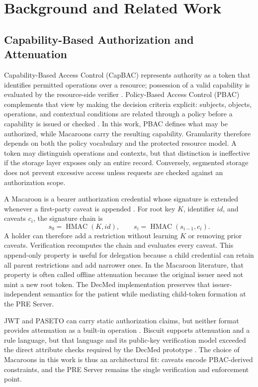 \section{Background and Related Work}
\label{sec:background}

\subsection{Capability-Based Authorization and Attenuation}

Capability-Based Access Control (CapBAC) represents authority as a token that identifies permitted operations over a resource; possession of a valid capability is evaluated by the resource-side verifier \cite{li2022capability}. Policy-Based Access Control (PBAC) complements that view by making the decision criteria explicit: subjects, objects, operations, and contextual conditions are related through a policy before a capability is issued or checked \cite{ferraiolo2015policy}. In this work, PBAC defines what may be authorized, while Macaroons carry the resulting capability. Granularity therefore depends on both the policy vocabulary and the protected resource model. A token may distinguish operations and contexts, but that distinction is ineffective if the storage layer exposes only an entire record. Conversely, segmented storage does not prevent excessive access unless requests are checked against an authorization scope.

A Macaroon is a bearer authorization credential whose signature is extended whenever a first-party caveat is appended \cite{birgisson2014macaroons}. For root key $K$, identifier $id$, and caveats $c_i$, the signature chain is
\begin{equation}
	s_0=\operatorname{HMAC}(K,id),\qquad
	s_i=\operatorname{HMAC}(s_{i-1},c_i).
	\label{eq:macaroon-chain}
\end{equation}
A holder can therefore add a restriction without learning $K$ or removing prior caveats. Verification recomputes the chain and evaluates every caveat. This append-only property is useful for delegation because a child credential can retain all parent restrictions and add narrower ones. In the Macaroon literature, that property is often called offline attenuation because the original issuer need not mint a new root token. The DecMed implementation preserves that issuer-independent semantics for the patient while mediating child-token formation at the PRE Server.

JWT and PASETO can carry static authorization claims, but neither format provides attenuation as a built-in operation \cite{jones2015jwt,arciszewski2022paseto}. Biscuit supports attenuation and a rule language, but that language and its public-key verification model exceeded the direct attribute checks required by the DecMed prototype \cite{biscuitsec}. The choice of Macaroons in this work is thus an architectural fit: caveats encode PBAC-derived constraints, and the PRE Server remains the single verification and enforcement point.

